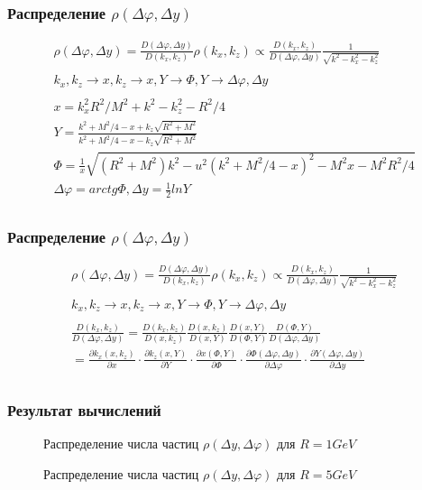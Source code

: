 \documentclass{beamer}
\renewcommand{\l}{\left( }
\renewcommand{\r}{\right) }
\renewcommand{\phi}{\varphi}
\newcommand{\pd}{\partial}
\newcommand{\br}[1]{\l {#1} \r}
\def\Dphi{\Delta\phi}
\def\Dy{\Delta y}
\def\kx{k_x}
\def\kxx{k_x^2}
\def\kz{k_z}
\def\kzz{k_z^2}
\def\f{\Phi}
\def\y{Y}
\def\dff#1#2#3#4{\frac{\partial #1 \left( #2 \right)}{\partial #3}}
\def\ra{\rightarrow}
\def\det#1#2{\frac{D \left( #1 \right)}{D \left( #2 \right)}}
\def\pa{\kx, \kz}
\def\pb{x, \kz}
\def\pc{x, Y}
\def\pd{\f, Y}
\def\pe{\Dphi, \Dy}
\begin{document}
\begin{frame}[fragile]
    \frametitle{Распределение $\rho (\Dphi, \Dy)$}    
	\begin{gather*}
		\rho(\Dphi, \Dy) = \det{\Dphi, \Dy}{\kx,\kz} \rho(\kx, \kz) \propto \det{\kx,\kz}{\Dphi, \Dy} \frac{1}{\sqrt{k^2 - \kxx - \kzz}} \\
		\\
		\pa\ra\pb\ra\pc\ra\pd\ra\pe \\
		\\
		x = \kxx R^2 / M^2  + k^2 - \kzz - R^2 / 4 \\
		\y = \frac{k^2 + M^2/4 - x + \kz \sqrt{R^2 + M^2}}{k^2 + M^2/4 - x - \kz \sqrt{R^2 + M^2}} \\
		\f =  \frac{1}{x}\sqrt{(R^2 + M^2)k^2 - u^2 (k^2 + M^2 / 4 - x)^2 - M^2 x - M^2 R^2 / 4} \\
		\Dphi = arctg\f, \Dy = \frac{1}{2} ln \y \\
	\end{gather*}    
\end{frame}

\begin{frame}[fragile]
   \frametitle{Распределение $\rho (\Dphi, \Dy)$}    
	\begin{gather*}
		\rho(\Dphi, \Dy) = \det{\Dphi, \Dy}{\kx,\kz} \rho(\kx, \kz) \propto \det{\kx,\kz}{\Dphi, \Dy} \frac{1}{\sqrt{k^2 - \kxx - \kzz}} \\
		\\
		\pa\ra\pb\ra\pc\ra\pd\ra\pe \\
		\\
		\det{\pa}{\pe} = \det{\pa}{\pb}\det{\pb}{\pc}\det{\pc}{\pd}\det{\pd}{\pe} \\
		= \dff{\kx}{\pb}{x}{\kz} \cdot \dff{\kz}{\pc}{Y}{x} \cdot \dff{x}{\pd}{\f}{Y} \cdot \dff{\f}{\pe}{\Dphi}{\Dy} \cdot \dff{Y}{\pe}{\Dy}{\Dphi} \\
	\end{gather*}    
\end{frame}

\begin{frame}[fragile]
    \frametitle{Результат вычислений}    
	\begin{minipage}[h]{0.49\linewidth}
		\begin{figure}
			\caption{Распределение числа частиц $\rho \br{\Dy, \Delta \phi}$ для $R = 1 GeV$}
		\end{figure}
	\end{minipage}
	\begin{minipage}[h]{0.49\linewidth}
		\begin{figure}
			\caption{Распределение числа частиц $\rho\br{\Dy, \Delta \phi}$ для $R = 5 GeV$}
		\end{figure}
	\end{minipage}
\end{frame}
\end{document}
